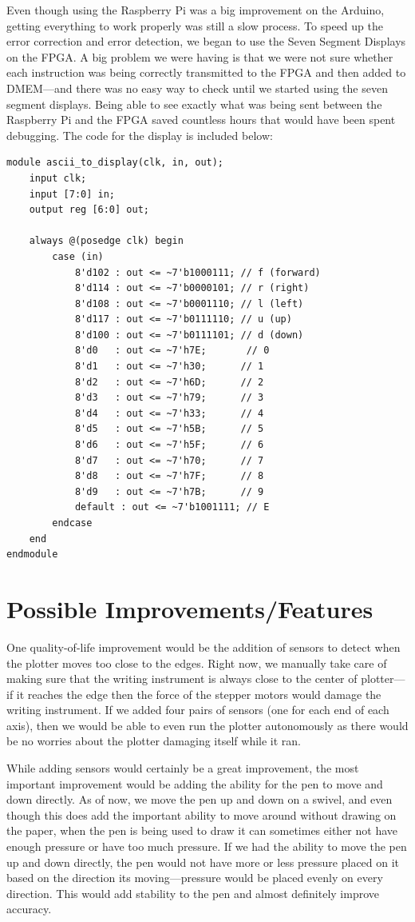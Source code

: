 \documentclass[12pt]{article}
\begin{document}
Even though using the Raspberry Pi was a big improvement on the Arduino, getting everything to work properly was still a slow process. To speed up the error correction and error detection, we began to use the Seven Segment Displays on the FPGA. A big problem we were having is that we were not sure whether each instruction was being correctly transmitted to the FPGA and then added to DMEM---and there was no easy way to check until we started using the seven segment displays. Being able to see exactly what was being sent between the Raspberry Pi and the FPGA saved countless hours that would have been spent debugging. The code for the display is included below:

\begin{lstlisting}[style=myVerilog, caption={ASCII on Seven Segment Display}]
module ascii_to_display(clk, in, out);
	input clk;
	input [7:0] in;
	output reg [6:0] out;
	
	always @(posedge clk) begin
		case (in)
			8'd102 : out <= ~7'b1000111; // f (forward)
			8'd114 : out <= ~7'b0000101; // r (right)
			8'd108 : out <= ~7'b0001110; // l (left)
			8'd117 : out <= ~7'b0111110; // u (up)
			8'd100 : out <= ~7'b0111101; // d (down)
			8'd0   : out <= ~7'h7E; 	  // 0
			8'd1   : out <= ~7'h30;      // 1
			8'd2   : out <= ~7'h6D;      // 2
			8'd3   : out <= ~7'h79;      // 3
			8'd4   : out <= ~7'h33;      // 4
			8'd5   : out <= ~7'h5B;      // 5
			8'd6   : out <= ~7'h5F;      // 6
			8'd7   : out <= ~7'h70;      // 7
			8'd8   : out <= ~7'h7F;      // 8
			8'd9   : out <= ~7'h7B;      // 9
			default : out <= ~7'b1001111; // E
		endcase
	end
endmodule
\end{lstlisting}

\section{Possible Improvements/Features}
One quality-of-life improvement would be the addition of sensors to detect when the plotter moves too close to the edges. Right now, we manually take care of making sure that the writing instrument is always close to the center of plotter---if it reaches the edge then the force of the stepper motors would damage the writing instrument. If we added four pairs of sensors (one for each end of each axis), then we would be able to even run the plotter autonomously as there would be no worries about the plotter damaging itself while it ran. 

While adding sensors would certainly be a great improvement, the most important improvement would be adding the ability for the pen to move and down directly. As of now, we move the pen up and down on a swivel, and even though this does add the important ability to move around without drawing on the paper, when the pen is being used to draw it can sometimes either not have enough pressure or have too much pressure. If we had the ability to move the pen up and down directly, the pen would not have more or less pressure placed on it based on the direction its moving---pressure would be placed evenly on every direction. This would add stability to the pen and almost definitely improve accuracy.
\end{document}
